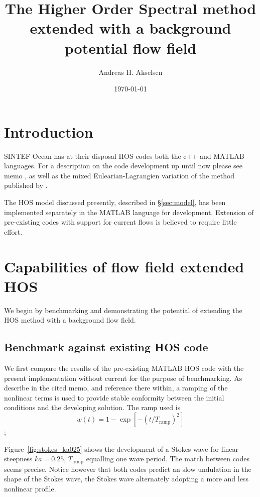 \documentclass[a4paper,12pt]{article}
\newcommand{\mr}{\mathrm}
\let\SSS\S
\renewcommand{\S}{^\mr{S}}
\renewcommand{\_}[1]{_\mr{#1}}
\begin{document}
\title{The Higher Order Spectral method extended with a background potential flow field}
\author{Andreas H. Akselsen}
\date{\today}
\maketitle

\tableofcontents

\section{Introduction}
SINTEF Ocean has at their disposal HOS codes both the c++ and MATLAB languages.
For a description on the code development up until now please see memo \citet{SFo2018_HOS}, as well as the mixed Eulearian-Lagrangien variation of the method published by \citep{fouques2020mixedHOS}.

The HOS model discussed presently, described in \SSS\ref{sec:model}, has been implemented separately in the MATLAB language for development. Extension of pre-existing codes with support for current flows is believed to require little effort.



\section{Capabilities of flow field extended HOS}
We begin by benchmarking and demonstrating the potential of extending the HOS method with a background flow field.

\subsection{Benchmark against existing HOS code}
We first compare the results of the pre-existing MATLAB HOS code \citep{SFo2018_HOS} with the present implementation without current for the purpose of benchmarking. 
As describe in the cited memo, and reference there within, a ramping of the nonlinear terms is used to provide stable conformity between the initial conditions and the developing solution. 
The ramp used is 
\[w(t) = 1-\exp[-(t/T\_{ramp})^2]\];

Figure~\ref{fig:stokes_ka025} shows the development of a Stokes wave for linear steepness $ka = 0.25$, $T\_{ramp}$ equalling one wave period.
The match between codes seems precise. 
Notice however that both codes predict an slow undulation in the shape of the Stokes wave, the Stokes wave alternately adopting a more and less nonlinear profile.  
\end{document}

